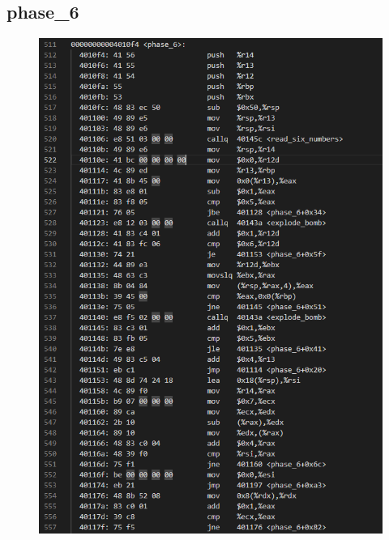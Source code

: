 \documentclass[12pt, a4paper, oneside]{ctexart}
\begin{document}
\subsection{phase\_6}
\begin{figure}[htbp]
    \includegraphics[scale=0.5]{image/2.7-1.png}

\end{figure}
\end{document}
